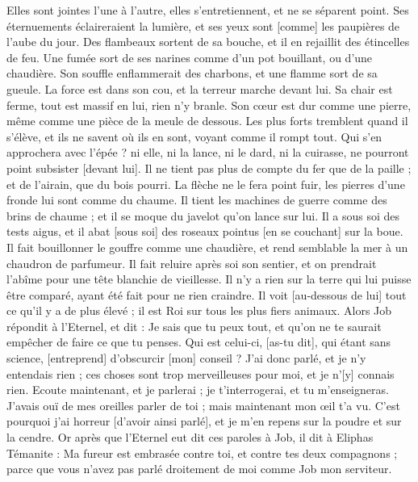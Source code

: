 \begin{multicols}{2}
Elles sont jointes l'une à l'autre, elles s'entretiennent, et ne se séparent point.
Ses éternuements éclaireraient la lumière, et ses yeux sont [comme] les paupières de l'aube du jour.
Des flambeaux sortent de sa bouche, et il en rejaillit des étincelles de feu.
Une fumée sort de ses narines comme d'un pot bouillant, ou d'une chaudière.
Son souffle enflammerait des charbons, et une flamme sort de sa gueule.
La force est dans son cou, et la terreur marche devant lui.
Sa chair est ferme, tout est massif en lui, rien n'y branle.
Son cœur est dur comme une pierre, même comme une pièce de la meule de dessous.
Les plus forts tremblent quand il s'élève, et ils ne savent où ils en sont, voyant comme il rompt tout.
Qui s'en approchera avec l'épée ? ni elle, ni la lance, ni le dard, ni la cuirasse, ne pourront point subsister [devant lui].
Il ne tient pas plus de compte du fer que de la paille ; et de l'airain, que du bois pourri.
La flèche ne le fera point fuir, les pierres d'une fronde lui sont comme du chaume.
Il tient les machines de guerre comme des brins de chaume ; et il se moque du javelot qu'on lance sur lui.
Il a sous soi des tests aigus, et il abat [sous soi] des roseaux pointus [en se couchant] sur la boue.
Il fait bouillonner le gouffre comme une chaudière, et rend semblable la mer à un chaudron de parfumeur.
Il fait reluire après soi son sentier, et on prendrait l'abîme pour une tête blanchie de vieillesse.
Il n'y a rien sur la terre qui lui puisse être comparé, ayant été fait pour ne rien craindre.
Il voit [au-dessous de lui] tout ce qu'il y a de plus élevé ; il est Roi sur tous les plus fiers animaux.
\VerseOne{}Alors Job répondit à l'Eternel, et dit :
Je sais que tu peux tout, et qu'on ne te saurait empêcher de faire ce que tu penses.
Qui est celui-ci, [as-tu dit], qui étant sans science, [entreprend] d'obscurcir [mon] conseil ? J'ai donc parlé, et je n'y entendais rien ; ces choses sont trop merveilleuses pour moi, et je n'[y] connais rien.
Ecoute maintenant, et je parlerai ; je t'interrogerai, et tu m'enseigneras.
J'avais ouï de mes oreilles parler de toi ; mais maintenant mon œil t'a vu.
C'est pourquoi j'ai horreur [d'avoir ainsi parlé], et je m'en repens sur la poudre et sur la cendre.
Or après que l'Eternel eut dit ces paroles à Job, il dit à Eliphas Témanite : Ma fureur est embrasée contre toi, et contre tes deux compagnons ; parce que vous n'avez pas parlé droitement de moi comme Job mon serviteur.

\end{multicols}
